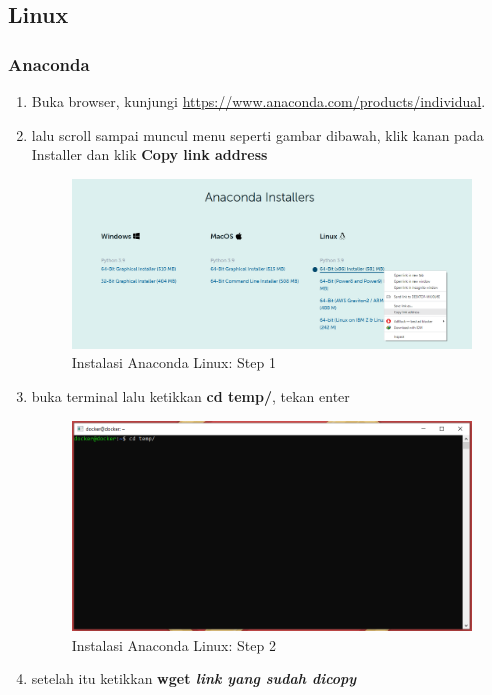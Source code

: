 \subsection{Linux}
\subsubsection{Anaconda}
\begin{enumerate}
\item Buka browser, kunjungi \url{https://www.anaconda.com/products/individual}.
\item lalu scroll sampai muncul menu seperti gambar dibawah, klik kanan pada Installer dan klik \textbf{Copy link address}
\begin{figure}[H]
        \centerline{\includegraphics[scale=0.35]{figures/instalasi-anaconda-linux/step1}}
        \caption{Instalasi Anaconda Linux: Step 1}
\end{figure}
\item buka terminal lalu ketikkan \textbf{cd temp/}, tekan enter
\begin{figure}[H]
        \centerline{\includegraphics[scale=0.5]{figures/instalasi-anaconda-linux/step2}}
        \caption{Instalasi Anaconda Linux: Step 2}
\end{figure}
\item setelah itu ketikkan \textbf{wget \textit{link yang sudah dicopy}}

\end{enumerate}
